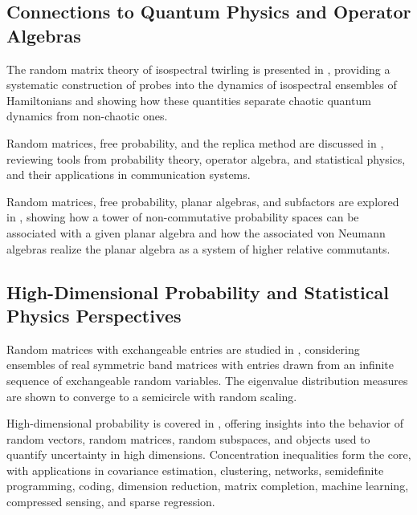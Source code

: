 \documentclass{article}
\begin{document}
\subsection{Connections to Quantum Physics and Operator Algebras}

The random matrix theory of isospectral twirling is presented in \cite{Oliviero2020RandomMT}, providing a systematic construction of probes into the dynamics of isospectral ensembles of Hamiltonians and showing how these quantities separate chaotic quantum dynamics from non-chaotic ones.

Random matrices, free probability, and the replica method are discussed in \cite{Mller2004RandomMF}, reviewing tools from probability theory, operator algebra, and statistical physics, and their applications in communication systems.

Random matrices, free probability, planar algebras, and subfactors are explored in \cite{Guionnet2007RandomMF}, showing how a tower of non-commutative probability spaces can be associated with a given planar algebra and how the associated von Neumann algebras realize the planar algebra as a system of higher relative commutants.

\subsection{High-Dimensional Probability and Statistical Physics Perspectives}

Random matrices with exchangeable entries are studied in \cite{Kirsch2018RandomMW}, considering ensembles of real symmetric band matrices with entries drawn from an infinite sequence of exchangeable random variables. The eigenvalue distribution measures are shown to converge to a semicircle with random scaling.

High-dimensional probability is covered in \cite{Vershynin2018HighDimensionalP}, offering insights into the behavior of random vectors, random matrices, random subspaces, and objects used to quantify uncertainty in high dimensions. Concentration inequalities form the core, with applications in covariance estimation, clustering, networks, semidefinite programming, coding, dimension reduction, matrix completion, machine learning, compressed sensing, and sparse regression.







\end{document}

